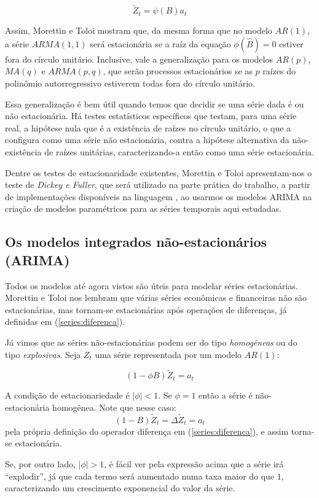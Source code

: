 \[
\tilde{Z}_t = \psi(B)a_t
\]

Assim, Morettin e Toloi \citep{morettin} mostram que, da mesma forma que no modelo $AR(1)$, a série $ARMA(1,1)$ será estacionária se a raíz da equação $\phi(\hat{B}) = 0$ estiver fora do círculo unitário. Inclusive, vale a generalização para os modelos $AR(p)$, $MA(q)$ e $ARMA(p,q)$, que serão processos estacionários se as $p$ raízes do polinômio autorregressivo estiverem todas fora do círculo unitário.

Essa generalização é bem útil quando temos que decidir se uma série dada é ou não estacionária. Há testes estatísticos específicos que testam, para uma série real, a hipótese nula que é a existência de raízes no círculo unitário, o que a configura como uma série não estacionária, contra a hipótese alternativa da não-existência de raízes unitárias, caracterizando-a então como uma série estacionária.

Dentre os testes de estacionaridade existentes, Morettin e Toloi \citep{morettin} apresentam-nos o teste de \emph{Dickey e Fuller}, que será utilizado na parte prática do trabalho, a partir de implementações disponíveis na linguagem , ao usarmos os modelos ARIMA na criação de modelos paramétricos para as séries temporais aqui estudadas.


\subsection{Os modelos integrados não-estacionários (ARIMA)}

Todos os modelos até agora vistos são úteis para modelar séries estacionárias. Morettin e Toloi \citep{morettin} nos lembram que várias séries econômicas e financeiras não são estacionárias, mas tornam-se estacionárias após operações de diferenças, já definidas em (\ref{series:diferenca}). 

Já vimos que as séries não-estacionárias podem ser do tipo \emph{homogêneas} ou do tipo \emph{explosivas}. Seja $Z_t$ uma série representada por um modelo $AR(1)$:

\[
(1 - \phi B)\tilde{Z}_t = a_t
\]

A condição de estacionariedade é $|\phi| < 1$. Se $\phi = 1$ então a série é não-estacionária homogênea. Note que nesse caso: 
\[ (1 - B)\tilde{Z}_t = \Delta \tilde{Z}_t = a_t \]
pela própria definição do operador diferença em (\ref{series:diferenca}), e assim torna-se estacionária. 

Se, por outro lado, $|\phi| > 1$, é fácil ver pela expressão acima que a série irá ``explodir'', já que cada termo será aumentado numa taxa maior do que $1$, caracterizando um crescimento exponencial do valor da série.

